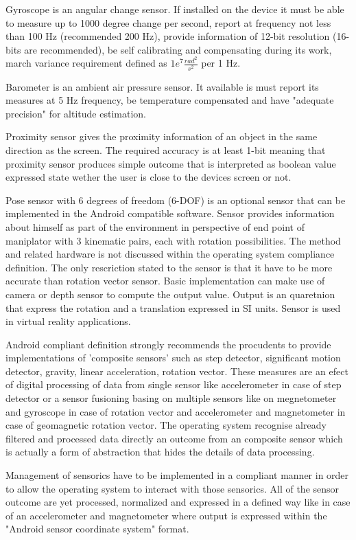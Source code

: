 \documentclass[../main.tex]{subfiles}
\begin{document}
Gyroscope is an angular change sensor. If installed on the device it must be able to measure up to 1000 degree change per second, report at frequency not less than 100 Hz (recommended 200 Hz), provide information of 12-bit resolution (16-bits are recommended), be self calibrating and compensating during its work, march variance requirement defined as $ 1e^7 \frac{rad^2}{s^2} $ per 1 Hz.

Barometer is an ambient air pressure sensor. It available is must report its measures at 5 Hz frequency, be temperature compensated and have "adequate precision" for altitude estimation.

Proximity sensor gives the proximity information of an object in the same direction as the screen. The required accuracy is at least 1-bit meaning that proximity sensor produces simple outcome that is interpreted as boolean value expressed state wether the user is close to the devices screen or not.

Pose sensor with 6 degrees of freedom (6-DOF) is an optional sensor that can be implemented in the Android compatible software. Sensor provides information about himself as part of the environment in perspective of end point of maniplator with 3 kinematic pairs, each with rotation possibilities. The method and related hardware is not discussed within the operating system compliance definition. The only rescriction stated to the sensor is that it have to be more accurate than rotation vector sensor. Basic implementation can make use of camera or depth sensor to compute the output value. Output is an quaretnion that express the rotation and a translation expressed in SI units. Sensor is used in virtual reality applications.

Android compliant definition strongly recommends the procudents to provide implementations of 'composite sensors' such as step detector, significant motion detector, gravity, linear acceleration, rotation vector. These measures are an efect of digital processing of data from single sensor like accelerometer in case of step detector or a sensor fusioning basing on multiple sensors like on megnetometer and gyroscope in case of rotation vector and accelerometer and magnetometer in case of geomagnetic rotation vector. The operating system recognise already filtered and processed data directly an outcome from an composite sensor which is actually a form of abstraction that hides the details of data processing.

Management of sensorics have to be implemented in a compliant manner in order to allow the operating system to interact with those sensorics. All of the sensor outcome are yet processed, normalized and expressed in a defined way like in case of an accelerometer and magnetometer where output is expressed within the "Android sensor coordinate system" format.
\end{document}

